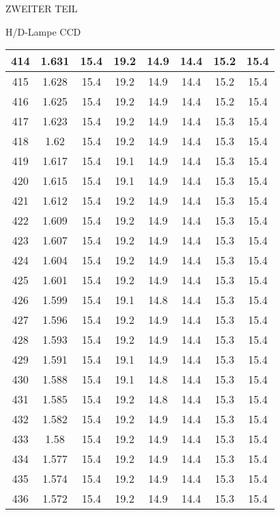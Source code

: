 \begin{appendix}
\begin{chapter}{ZWEITER TEIL}
\begin{section}{H/D-Lampe CCD}
\begin{scriptsize}
\begin{longtable}[htbp]{|c|c|c|c|c|c|c|c|}
            414 & 1.631 & 15.4 & 19.2 & 14.9 & 14.4 & 15.2 & 15.4 \\ \hline
            415 & 1.628 & 15.4 & 19.2 & 14.9 & 14.4 & 15.2 & 15.4 \\ \hline
            416 & 1.625 & 15.4 & 19.2 & 14.9 & 14.4 & 15.2 & 15.4 \\ \hline
            417 & 1.623 & 15.4 & 19.2 & 14.9 & 14.4 & 15.3 & 15.4 \\ \hline
            418 & 1.62 & 15.4 & 19.2 & 14.9 & 14.4 & 15.3 & 15.4 \\ \hline
            419 & 1.617 & 15.4 & 19.1 & 14.9 & 14.4 & 15.3 & 15.4 \\ \hline
            420 & 1.615 & 15.4 & 19.1 & 14.9 & 14.4 & 15.3 & 15.4 \\ \hline
            421 & 1.612 & 15.4 & 19.2 & 14.9 & 14.4 & 15.3 & 15.4 \\ \hline
            422 & 1.609 & 15.4 & 19.2 & 14.9 & 14.4 & 15.3 & 15.4 \\ \hline
            423 & 1.607 & 15.4 & 19.2 & 14.9 & 14.4 & 15.3 & 15.4 \\ \hline
            424 & 1.604 & 15.4 & 19.2 & 14.9 & 14.4 & 15.3 & 15.4 \\ \hline
            425 & 1.601 & 15.4 & 19.2 & 14.9 & 14.4 & 15.3 & 15.4 \\ \hline
            426 & 1.599 & 15.4 & 19.1 & 14.8 & 14.4 & 15.3 & 15.4 \\ \hline
            427 & 1.596 & 15.4 & 19.2 & 14.9 & 14.4 & 15.3 & 15.4 \\ \hline
            428 & 1.593 & 15.4 & 19.2 & 14.9 & 14.4 & 15.3 & 15.4 \\ \hline
            429 & 1.591 & 15.4 & 19.1 & 14.9 & 14.4 & 15.3 & 15.4 \\ \hline
            430 & 1.588 & 15.4 & 19.1 & 14.8 & 14.4 & 15.3 & 15.4 \\ \hline
            431 & 1.585 & 15.4 & 19.2 & 14.8 & 14.4 & 15.3 & 15.4 \\ \hline
            432 & 1.582 & 15.4 & 19.2 & 14.9 & 14.4 & 15.3 & 15.4 \\ \hline
            433 & 1.58 & 15.4 & 19.2 & 14.9 & 14.4 & 15.3 & 15.4 \\ \hline
            434 & 1.577 & 15.4 & 19.2 & 14.9 & 14.4 & 15.3 & 15.4 \\ \hline
            435 & 1.574 & 15.4 & 19.2 & 14.9 & 14.4 & 15.3 & 15.4 \\ \hline
            436 & 1.572 & 15.4 & 19.2 & 14.9 & 14.4 & 15.3 & 15.4 \\ \hline

\end{longtable}
\end{scriptsize}
\end{section}
\end{chapter}
\end{appendix}
